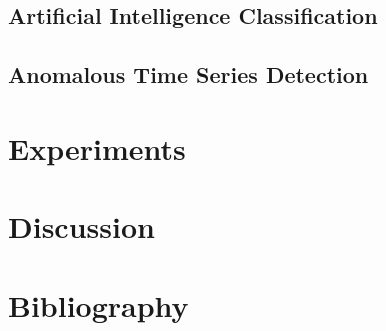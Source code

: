 \documentclass[a4paper, 10pt]{article}
\begin{document}
\subsection{Artificial Intelligence Classification}

\subsection{Anomalous Time Series Detection}

\section{Experiments \label{experiments}}

\section{Discussion \label{discussion}}

\section*{Bibliography}

\printbibliography
\end{document}
